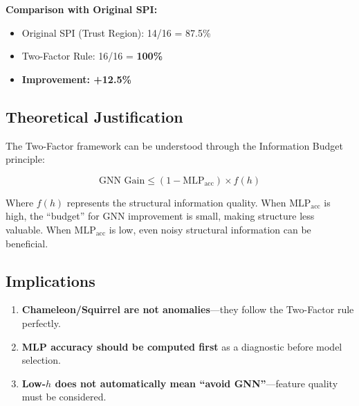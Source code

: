 \textbf{Comparison with Original SPI:}
\begin{itemize}
    \item Original SPI (Trust Region): 14/16 = 87.5\%
    \item Two-Factor Rule: 16/16 = \textbf{100\%}
    \item \textbf{Improvement: +12.5\%}
\end{itemize}

\subsection{Theoretical Justification}

The Two-Factor framework can be understood through the Information Budget principle:

\begin{equation}
\text{GNN Gain} \leq (1 - \text{MLP}_{\text{acc}}) \times f(h)
\end{equation}

Where $f(h)$ represents the structural information quality. When $\text{MLP}_{\text{acc}}$ is high, the ``budget'' for GNN improvement is small, making structure less valuable. When $\text{MLP}_{\text{acc}}$ is low, even noisy structural information can be beneficial.

\subsection{Implications}

\begin{enumerate}
    \item \textbf{Chameleon/Squirrel are not anomalies}---they follow the Two-Factor rule perfectly.
    \item \textbf{MLP accuracy should be computed first} as a diagnostic before model selection.
    \item \textbf{Low-$h$ does not automatically mean ``avoid GNN''}---feature quality must be considered.
\end{enumerate}
